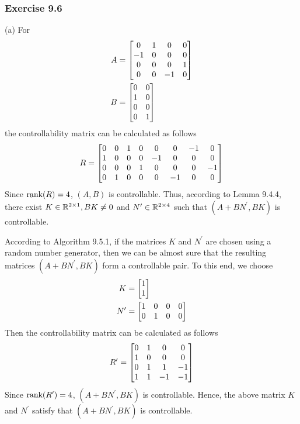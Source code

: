 \subsubsection{Exercise 9.6}
(a) For
\begin{align}
    A &= \begin{bmatrix} 0 &1 &0 &0 \\ -1 &0 &0 &0 \\ 0 &0 &0 &1 \\ 0 &0 &-1 &0 \end{bmatrix} \\
    B &= \begin{bmatrix} 0 &0 \\ 1 &0 \\ 0 &0 \\ 0 &1 \end{bmatrix}
\end{align}
the controllability matrix can be calculated as follows
\begin{equation}
    R = \begin{bmatrix}
    0     &0     &1     &0     &0     &0    &-1     &0 \\ 
    1     &0     &0     &0    &-1     &0     &0     &0 \\ 
    0     &0     &0     &1     &0     &0     &0    &-1 \\ 
    0     &1     &0     &0     &0    &-1     &0     &0
    \end{bmatrix}
\end{equation}
Since $\textnormal{rank}(R) = 4$, $(A,B)$ is controllable. Thus, according to Lemma 9.4.4, there exist $K\in\mathbb{R}^{2\times 1},BK\neq 0$ and $N^\prime\in\mathbb{R}^{2\times 4}$ such that $(A+BN^\prime,BK)$ is controllable. 

According to Algorithm 9.5.1, if the matrices $K$ and $N^\prime$ are chosen using a random number generator, then we can be almost sure that the resulting matrices $(A+BN^\prime,BK)$ form a controllable pair. To this end, we choose 
\begin{align}
    K &= \begin{bmatrix} 1 \\ 1 \end{bmatrix} \\
    N^\prime &= \begin{bmatrix} 1 &0 &0 &0 \\ 0 &1 &0 &0 \end{bmatrix}
\end{align}
Then the controllability matrix can be calculated as follows
\begin{equation}
    R^\prime = \begin{bmatrix} 
    0     &1     &0     &0 \\ 
    1     &0     &0     &0 \\ 
    0     &1     &1    &-1 \\ 
    1     &1    &-1    &-1
    \end{bmatrix}
\end{equation}
Since $\textnormal{rank}(R^\prime) = 4$, $(A+BN^\prime,BK)$ is controllable. Hence, the above matrix $K$ and $N^\prime$ satisfy that $(A+BN^\prime,BK)$ is controllable.

